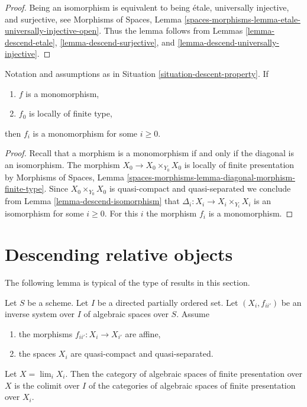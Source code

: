 \begin{proof}
Being an isomorphism is equivalent to being \'etale, universally injective,
and surjective, see
Morphisms of Spaces, Lemma
\ref{spaces-morphisms-lemma-etale-universally-injective-open}.
Thus the lemma follows from
Lemmas \ref{lemma-descend-etale},
\ref{lemma-descend-surjective}, and
\ref{lemma-descend-universally-injective}.
\end{proof}

\begin{lemma}
\label{lemma-descend-monomorphism}
Notation and assumptions as in Situation \ref{situation-descent-property}. If
\begin{enumerate}
\item $f$ is a monomorphism,
\item $f_0$ is locally of finite type,
\end{enumerate}
then $f_i$ is a monomorphism for some $i \geq 0$.
\end{lemma}

\begin{proof}
Recall that a morphism is a monomorphism if and only if the diagonal is
an isomorphism. The morphism $X_0 \to X_0 \times_{Y_0} X_0$ is locally of
finite presentation by
Morphisms of Spaces, Lemma
\ref{spaces-morphisms-lemma-diagonal-morphism-finite-type}.
Since $X_0 \times_{Y_0} X_0$ is quasi-compact and quasi-separated
we conclude from
Lemma \ref{lemma-descend-isomorphism}
that $\Delta_i : X_i \to X_i \times_{Y_i} X_i$ is an isomorphism for
some $i \geq 0$. For this $i$ the morphism $f_i$ is a monomorphism.
\end{proof}















\section{Descending relative objects}
\label{section-descending-relative}

\noindent
The following lemma is typical of the type of results in this section.

\begin{lemma}
\label{lemma-descend-finite-presentation}
Let $S$ be a scheme. Let $I$ be a directed partially ordered set.
Let $(X_i, f_{ii'})$ be an inverse system over $I$ of algebraic spaces
over $S$. Assume
\begin{enumerate}
\item the morphisms $f_{ii'} : X_i \to X_{i'}$ are affine,
\item the spaces $X_i$ are quasi-compact and quasi-separated.
\end{enumerate}
Let $X = \lim_i X_i$. Then the category of algebraic spaces
of finite presentation over $X$ is the colimit over $I$ of the
categories of algebraic spaces of finite presentation over $X_i$.
\end{lemma}

